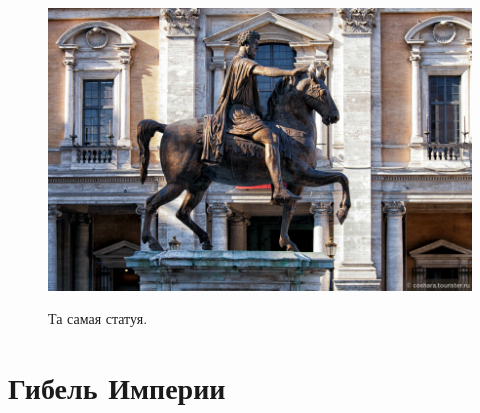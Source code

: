 \begin{figure}[h!tb]
	\centering\includegraphics[scale=0.5]{Relig_gambit/157293223814548021.png}
	\label{fig:gambit5} %
	\caption{	Та самая статуя.	}
\end{figure}
\section{ Гибель Империи}

